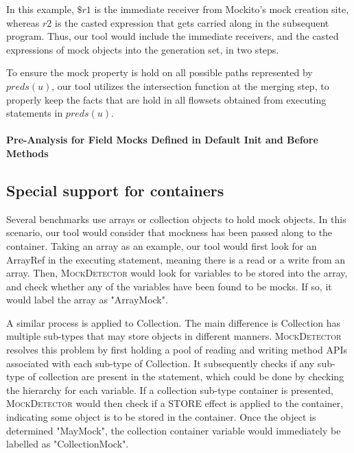 In this example, $\$r1$ is the immediate receiver from Mockito's mock creation site, whereas $r2$ is the casted expression that gets carried along in the subsequent program. Thus, our tool would include the immediate receivers, and the casted expressions of mock objects into the generation set, in two steps. 

To ensure the mock property is hold on all possible paths represented by $preds(u)$, our tool utilizes the intersection function at the merging step, to properly keep the facts that are hold in all flowsets obtained from executing statements in $preds(u)$.

\paragraph{Pre-Analysis for Field Mocks Defined in Default Init and Before Methods}
\label{subsubsec:pre-analysis}

\subsection{Special support for containers}
\label{subsec:container}

Several benchmarks use arrays or collection objects to hold mock objects. In this scenario, our tool would consider that mockness has been passed along to the container. Taking an array as an example, our tool would first look for an ArrayRef in the executing statement, meaning there is a read or a write from an array. Then, \textsc{MockDetector} would look for variables to be stored into the array, and check whether any of the variables have been found to be mocks. If so, it would label the array as "ArrayMock".

A similar process is applied to Collection. The main difference is Collection has multiple sub-types that may store objects in different manners. \textsc{MockDetector} resolves this problem by first holding a pool of reading and writing method APIs associated with each sub-type of Collection. It subsequently checks if any sub-type of collection are present in the statement, which could be done by checking the hierarchy for each variable. If a collection sub-type container is presented, \textsc{MockDetector} would then check if a STORE effect is applied to the container, indicating some object is to be stored in the container. Once the object is determined "MayMock", the collection container variable would immediately be labelled as "CollectionMock".


